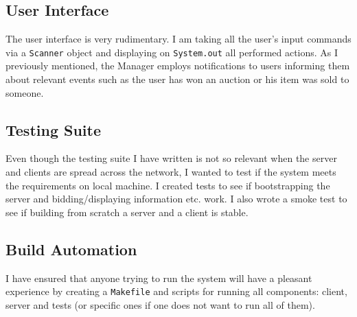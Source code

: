 \documentclass[11pt]{article}
\begin{document}
 \subsection{User Interface}
 The user interface is very rudimentary. I am taking all the user's input commands via a \texttt{Scanner} object and displaying on \texttt{System.out} all performed actions. As I previously mentioned, the Manager employs notifications to users informing them about relevant events such as the user has won an auction or his item was sold to someone.
 
 \subsection{Testing Suite}
 Even though the testing suite I have written is not so relevant when the server and clients are spread across the network, I wanted to test if the system meets the requirements on local machine. I created tests to see if bootstrapping the server and bidding/displaying information etc. work. I also wrote a smoke test to see if building from scratch a server and a client is stable.
 
 \subsection{Build Automation}
 I have ensured that anyone trying to run the system will have a pleasant experience by creating a \texttt{Makefile} and scripts for running all components: client, server and tests (or specific ones if one does not want to run all of them).
 
\end{document}

